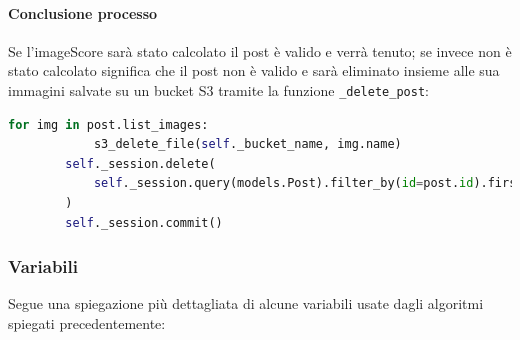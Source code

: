 \paragraph{Conclusione processo} \aCapo{}
Se l'imageScore sarà stato calcolato il post è valido e verrà tenuto; se invece non è stato calcolato significa che il post non è valido e sarà eliminato insieme alle sua immagini salvate su un bucket S3 tramite la funzione \verb+_delete_post+:
\begin{lstlisting}[language=Python]
        for img in post.list_images:
            s3_delete_file(self._bucket_name, img.name)
        self._session.delete(
            self._session.query(models.Post).filter_by(id=post.id).first()
        )
        self._session.commit()
\end{lstlisting}
\subsubsection{Variabili}
Segue una spiegazione più dettagliata di alcune variabili usate dagli algoritmi spiegati precedentemente:
